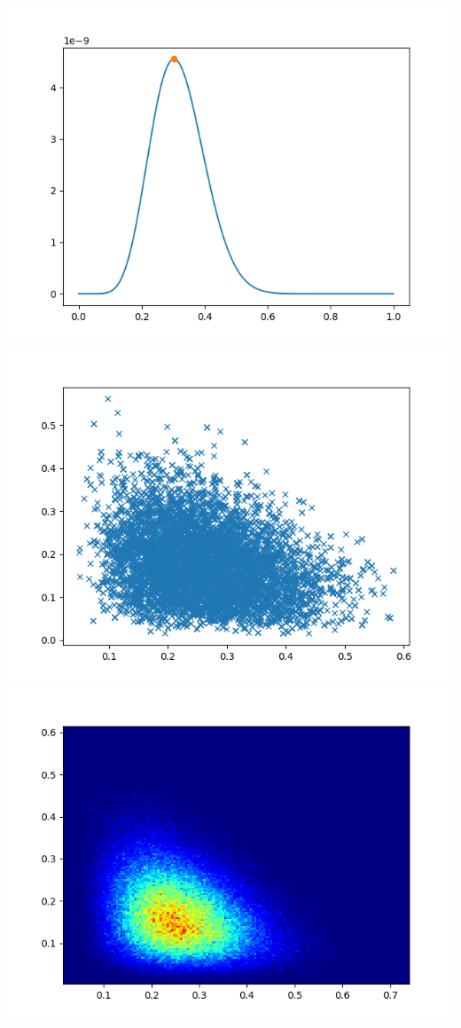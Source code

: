\documentclass[pt12]{article}
\begin{document}
\newpage

\begin{center}
\includegraphics[scale=0.5]{hip21.png}\\
\includegraphics[scale=0.5]{sc21.png}\\
\includegraphics[scale=0.5]{den21.png}\\
\end{center}
\end{document}
